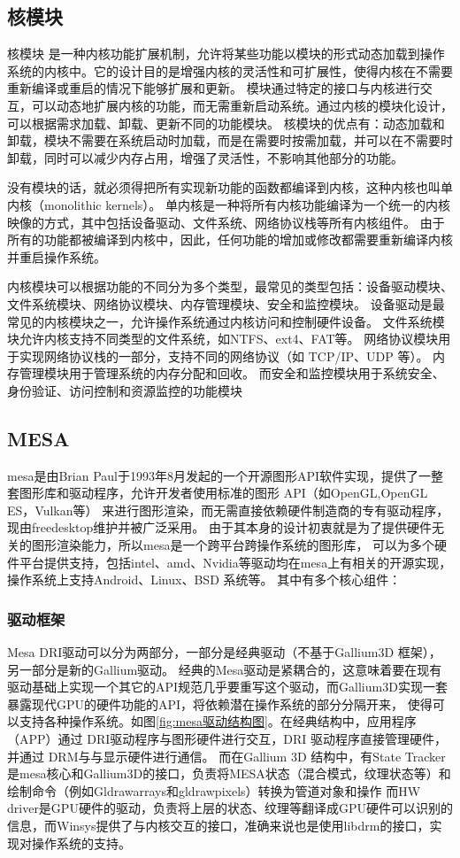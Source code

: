 \subsection{核模块}
核模块 是一种内核功能扩展机制，允许将某些功能以模块的形式动态加载到操作系统的内核中。它的设计目的是增强内核的灵活性和可扩展性，使得内核在不需要重新编译或重启的情况下能够扩展和更新。
模块通过特定的接口与内核进行交互，可以动态地扩展内核的功能，而无需重新启动系统。通过内核的模块化设计，可以根据需求加载、卸载、更新不同的功能模块。
核模块的优点有：动态加载和卸载，模块不需要在系统启动时加载，而是在需要时按需加载，并可以在不需要时卸载，同时可以减少内存占用，增强了灵活性，不影响其他部分的功能。

没有模块的话，就必须得把所有实现新功能的函数都编译到内核，这种内核也叫单内核（monolithic kernels）。
单内核是一种将所有内核功能编译为一个统一的内核映像的方式，其中包括设备驱动、文件系统、网络协议栈等所有内核组件。
由于所有的功能都被编译到内核中，因此，任何功能的增加或修改都需要重新编译内核并重启操作系统。

内核模块可以根据功能的不同分为多个类型，最常见的类型包括：设备驱动模块、文件系统模块、网络协议模块、内存管理模块、安全和监控模块。
设备驱动是最常见的内核模块之一，允许操作系统通过内核访问和控制硬件设备。
文件系统模块允许内核支持不同类型的文件系统，如NTFS、ext4、FAT等。
网络协议模块用于实现网络协议栈的一部分，支持不同的网络协议（如 TCP/IP、UDP 等）。
内存管理模块用于管理系统的内存分配和回收。
而安全和监控模块用于系统安全、身份验证、访问控制和资源监控的功能模块

\subsection{MESA}
mesa\cite{mesa}是由Brian Paul于1993年8月发起的一个开源图形API软件实现，提供了一整套图形库和驱动程序，允许开发者使用标准的图形 API（如OpenGL,OpenGL ES，Vulkan等）
来进行图形渲染，而无需直接依赖硬件制造商的专有驱动程序，现由freedesktop维护并被广泛采用。
由于其本身的设计初衷就是为了提供硬件无关的图形渲染能力，所以mesa是一个跨平台跨操作系统的图形库，
可以为多个硬件平台提供支持，包括intel、amd、Nvidia等驱动均在mesa上有相关的开源实现，操作系统上支持Android、Linux、BSD 系统等。
其中有多个核心组件：

\subsubsection{驱动框架}
Mesa DRI驱动可以分为两部分，一部分是经典驱动（不基于Gallium3D 框架），另一部分是新的Gallium驱动。
经典的Mesa驱动是紧耦合的，这意味着要在现有驱动基础上实现一个其它的API规范几乎要重写这个驱动，而Gallium3D实现一套暴露现代GPU的硬件功能的API，将依赖潜在操作系统的部分分隔开来，
使得可以支持各种操作系统。如图\ref{fig:mesa驱动结构图}。在经典结构中，应用程序（APP）通过 DRI驱动程序与图形硬件进行交互，DRI 驱动程序直接管理硬件，并通过 DRM与与显示硬件进行通信。
而在Gallium 3D 结构中，有State Tracker是mesa核心和Gallium3D的接口，负责将MESA状态（混合模式，纹理状态等）和绘制命令（例如Gldrawarrays和gldrawpixels）转换为管道对象和操作
而HW driver是GPU硬件的驱动，负责将上层的状态、纹理等翻译成GPU硬件可以识别的信息，而Winsys提供了与内核交互的接口，准确来说也是使用libdrm的接口，实现对操作系统的支持。

